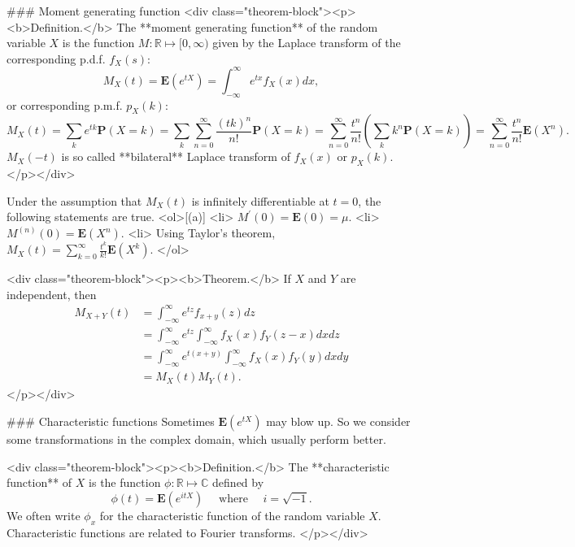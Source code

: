### Moment generating function
<div class="theorem-block"><p><b>Definition.</b> 
The **moment generating function** of the random variable $X$ is the function $M: \mathbb{R} \mapsto [0, \infty)$ given by the Laplace transform of the corresponding p.d.f. $f_X(s)$:
$$\begin{equation}
    M_X(t) = \mathbf{E} \left( e^{tX} \right) = \int_{-\infty}^\infty e^{tx} f_X(x) dx,
\end{equation}$$
or corresponding p.m.f. $p_X(k)$:
$$\begin{equation}
    M_X(t) = \sum_{k} e^{t k} \mathbf{P}(X=k) 
    = \sum_k \sum_{n=0}^{\infty} \frac{(t k)^{n}}{n !} \mathbf{P}(X=k)
    = \sum_{n=0}^{\infty} \frac{t^{n}}{n !}\left(\sum_k k^{n} \mathbf{P}(X=k)\right) 
    = \sum_{n=0}^{\infty} \frac{t^{n}}{n !} \mathbf{E}\left(X^{n}\right).
\end{equation}$$
$M_X(-t)$ is so called **bilateral** Laplace transform of $f_X(x)$ or $p_X(k)$.
</p></div>

Under the assumption that $M_X(t)$ is infinitely differentiable at $t=0$, the following statements are true. 
<ol>[(a)]
    <li> $M^\prime(0) = \mathbf{E}(0) = \mu$.
    <li> $M^{(n)}(0) = \mathbf{E}(X^n)$.
    <li> Using Taylor's theorem, $M_X(t) = \sum_{k=0}^\infty \frac{t^k}{k!} \mathbf{E}(X^k)$.
</ol>

<div class="theorem-block"><p><b>Theorem.</b> 
If $X$ and $Y$ are independent, then
$$\begin{equation}
    \begin{split}
        M_{X+Y}(t) &= \int_{-\infty}^\infty e^{tz} f_{x+y}(z) dz \\
        &= \int_{-\infty}^\infty e^{tz} \int_{-\infty}^\infty f_X(x) f_Y(z-x) dx dz \\
        &= \int_{-\infty}^\infty e^{t(x+y)} \int_{-\infty}^\infty f_X(x) f_Y(y) dx dy \\
        &= M_X(t) M_Y(t).
    \end{split}
\end{equation}$$
</p></div>

### Characteristic functions
Sometimes $\mathbf{E}(e^{tX})$ may blow up. So we consider some transformations in the complex domain, which usually perform better.

<div class="theorem-block"><p><b>Definition.</b> 
The **characteristic function** of $X$ is the function $\phi: \mathbb{R} \mapsto \mathbb{C}$ defined by
$$\begin{equation}
    \phi(t)=\mathbf{E}\left(e^{i t X}\right) \quad \text { where } \quad i=\sqrt{-1}.
\end{equation}$$
We often write $\phi_x$ for the characteristic function of the random variable $X$. Characteristic functions are related to Fourier transforms. 
</p></div>

